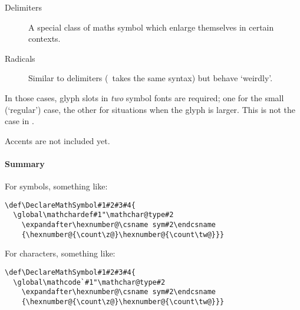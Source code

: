 \begin{description}
\item[Delimiters] A special class of maths symbol which enlarge themselves in certain contexts.

\cmd\DeclareMathDelimiter{}

\item[Radicals] Similar to delimiters (\cmd\DeclareMathRadical\ takes the same syntax) but
behave `weirdly'.
\end{description}
In those cases, glyph slots in \emph{two} symbol fonts are required; one for the small (`regular') case,
the other for situations when the glyph is larger. This is not the case in \XeTeX.

Accents are not included yet.

\paragraph{Summary}

For symbols, something like:
\begin{Verbatim}
\def\DeclareMathSymbol#1#2#3#4{
  \global\mathchardef#1"\mathchar@type#2
    \expandafter\hexnumber@\csname sym#2\endcsname
    {\hexnumber@{\count\z@}\hexnumber@{\count\tw@}}}
\end{Verbatim}
For characters, something like:
\begin{Verbatim}
\def\DeclareMathSymbol#1#2#3#4{
  \global\mathcode`#1"\mathchar@type#2
    \expandafter\hexnumber@\csname sym#2\endcsname
    {\hexnumber@{\count\z@}\hexnumber@{\count\tw@}}}
\end{Verbatim}
